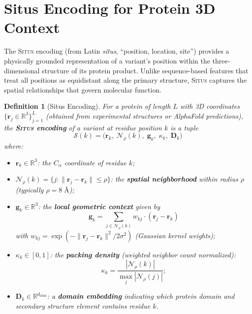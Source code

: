 \documentclass[11pt,a4paper]{article}
\newtheorem{definition}[theorem]{Definition}
\theoremstyle{definition}
\newcommand{\R}{\mathbb{R}}
\newcommand{\situs}{\textsc{Situs}}
\newcommand{\situsenc}{\mathcal{S}}
\begin{document}
\section{Situs Encoding for Protein 3D Context}
\label{sec:situs}
The \situs{} encoding (from Latin \textit{situs}, ``position, location, site'') provides a physically grounded representation of a variant's position within the three-dimensional structure of its protein product.
Unlike sequence-based features that treat all positions as equidistant along the primary structure, \situs{} captures the spatial relationships that govern molecular function.
\begin{definition}[Situs Encoding]
\label{def:situs}
For a protein of length $L$ with 3D coordinates $\{\mathbf{r}_j \in \R^3\}_{j=1}^{L}$ (obtained from experimental structures or AlphaFold predictions), the \textbf{\situs{} encoding} of a variant at residue position $k$ is a tuple
\begin{equation}
    \situsenc(k) = \big(\mathbf{r}_k,\; \mathcal{N}_\rho(k),\; \mathbf{g}_k,\; \kappa_k,\; \mathbf{D}_k \big)
\end{equation}
where:
\begin{itemize}[leftmargin=*]
    \item $\mathbf{r}_k \in \R^3$: the $C_\alpha$ coordinate of residue $k$;
    \item $\mathcal{N}_\rho(k) = \{j : \|\mathbf{r}_j - \mathbf{r}_k\| \leq \rho\}$: the \textbf{spatial neighborhood} within radius $\rho$ (typically $\rho = 8\;\text{\AA}$);
    \item $\mathbf{g}_k \in \R^3$: the \textbf{local geometric context} given by
    \begin{equation}
        \mathbf{g}_k = \sum_{j \in \mathcal{N}_\rho(k)} w_{kj} \cdot (\mathbf{r}_j - \mathbf{r}_k)
    \end{equation}
    with $w_{kj} = \exp(-\|\mathbf{r}_j - \mathbf{r}_k\|^2 / 2\sigma^2)$ (Gaussian kernel weights);
    \item $\kappa_k \in [0,1]$: the \textbf{packing density} (weighted neighbor count normalized):
    \begin{equation}
        \kappa_k = \frac{|\mathcal{N}_\rho(k)|}{\max_{j} |\mathcal{N}_\rho(j)|};
    \end{equation}
    \item $\mathbf{D}_k \in \R^{d_{\text{dom}}}$: a \textbf{domain embedding} indicating which protein domain and secondary structure element contains residue $k$.
\end{itemize}
\end{definition}
\end{document}
